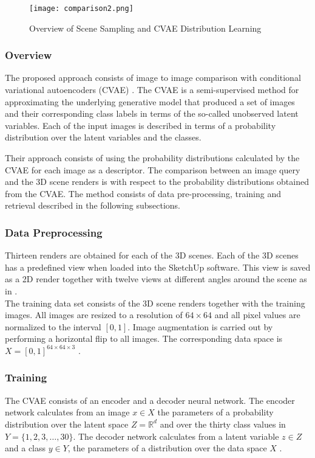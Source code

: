\documentclass[../main.tex]{subfiles}
\begin{document}
\begin{figure}[htb]
	\centering
	\texttt{[image: comparison2.png]}
	\caption{\label{fig:cvae} Overview of Scene Sampling and CVAE Distribution Learning}
\end{figure}

\subsubsection{Overview}
The proposed approach consists of image to image comparison with conditional variational autoencoders (CVAE) \cite{Kingma2014a}. The CVAE is a semi-supervised method for approximating the underlying generative model that produced a set of images and their corresponding class labels in terms of the so-called unobserved latent variables. Each of the input images is described in terms of a probability distribution over the latent variables and the classes. 

Their approach consists of using the probability distributions calculated by the CVAE for each image as a descriptor. The comparison between an image query and the 3D scene renders is with respect to the probability distributions obtained from the CVAE. The method consists of data pre-processing, training and retrieval described in the following subsections.

\subsubsection{Data Preprocessing}
Thirteen renders are obtained for each of the 3D scenes. Each of the 3D scenes has a predefined view when loaded into the SketchUp software. This view is saved as a 2D render together with twelve views at different angles around the scene as in \cite{Su2015}.\\

The training data set consists of the 3D scene renders together with the training images. All images are resized to a resolution of $64\times64$ and all pixel values are normalized to the interval $[0,1]$. Image augmentation is carried out by performing a horizontal flip to all images. The corresponding data space is $X = [0,1]^{64\times 64 \times 3}$ . 

\subsubsection{Training}
The CVAE consists of an encoder and a decoder neural network. The encoder network calculates from an image $x\in X$ the parameters of a probability distribution over the latent space $Z = \mathbb{R}^d$ and over the thirty class values in $Y = \{1,2,3,\ldots, 30\}$. The decoder network calculates from a latent variable $z\in Z$ and a class $y\in Y$, the parameters of a distribution over the data space $X$ .\\
\end{document}
